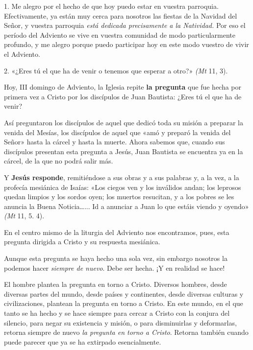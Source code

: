 				\begin{body}
					1. Me alegro por el hecho de que hoy puedo estar en vuestra parroquia. Efectivamente, ya están muy cerca para nosotros las fiestas de la Navidad del Señor, y vuestra parroquia \emph{está dedicada precisamente a la Natividad.} Por eso el período del Adviento se vive en vuestra comunidad de modo particularmente profundo, y me alegro porque puedo participar hoy en este modo vuestro de vivir el Adviento.
					
					2. «¿Eres tú el que ha de venir o tenemos que esperar a otro?» \emph{(Mt} 11, 3). 
					
					Hoy, III domingo de Adviento, la Iglesia repite \textbf{la pregunta} que fue hecha por primera vez a Cristo por los discípulos de Juan Bautista: ¿Eres tú el que ha de venir? 
					
					Así preguntaron los discípulos de aquel que dedicó toda su misión a preparar la venida del Mesías, los discípulos de aquel que «amó y preparó la venida del Señor» hasta la cárcel y hasta la muerte. Ahora sabemos que, cuando sus discípulos presentan esta pregunta a Jesús, Juan Bautista se encuentra ya en la cárcel, de la que no podrá salir más. 
					
					Y \textbf{Jesús responde}, remitiéndose a sus obras y a sus palabras y, a la vez, a la profecía mesiánica de Isaías: «Los ciegos ven y los inválidos andan; los leprosos quedan limpios y los sordos oyen; los muertos resucitan, y a los pobres se les anuncia la Buena Noticia\ldots{...} Id a anunciar a Juan lo que estáis viendo y oyendo» \emph{(Mt} 11, 5. 4). 
					
					En el centro mismo de la liturgia del Adviento nos encontramos, pues, esta pregunta dirigida a Cristo y su respuesta mesiánica. 
					
					Aunque esta pregunta se haya hecho una sola vez, sin embargo nosotros la podemos hacer \emph{siempre de nuevo}. Debe ser hecha. ¡Y en realidad se hace! 
					
					El hombre plantea la pregunta en torno a Cristo. Diversos hombres, desde diversas partes del mundo, desde países y continentes, desde diversas culturas y civilizaciones, plantean la pregunta en torno a Cristo. En este mundo, en el que tanto se ha hecho y se hace siempre para cercar a Cristo con la conjura del silencio, para negar su existencia y misión, o para disminuirlas y deformarlas, retorna siempre de nuevo \emph{la pregunta en torno a Cristo}. Retorna también cuando puede parecer que ya se ha extirpado esencialmente. 
					

\end{body}
